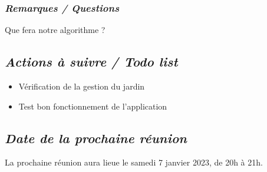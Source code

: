 \documentclass[french,a4paper]{article}
\begin{document}
\subsubsection*{\textit{Remarques / Questions}}
Que fera notre algorithme ?

\subsection*{\textit{Actions à suivre / Todo list}}
\begin{itemize}
  \item Vérification de la gestion du jardin
  \item Test bon fonctionnement de l'application
\end{itemize}

\subsection*{\textit{Date de la prochaine réunion}}
La prochaine réunion aura lieue le samedi 7 janvier 2023, de 20h à 21h.
\end{document}
